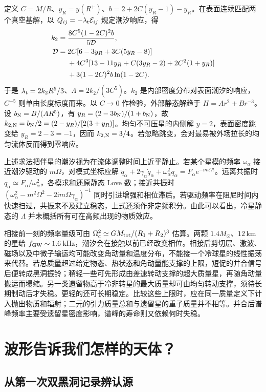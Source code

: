 定义 $C=M/R$、$y_R=y(R^+)$、$b=2+2C(y_R-1)-y_R$。在表面连续匹配两个真空基解，以 $Q_{ij}=-\lambda_{\rm t}{\cal E}_{ij}$ 规定潮汐响应，得
\begin{align*}
 k_2={}&\frac{8 C^5(1-2C)^2 b}{5{\cal D}},\\
 {\cal D}={}&2C[6-3y_R+3C(5y_R-8)]\\
 &+4C^3[13-11y_R+C(3y_R-2)+2C^2(1+y_R)]\\
 &+3(1-2C)^2 b\ln(1-2C).
\end{align*}
于是 $\lambda_{\rm t}=2 k_2 R^5/3$、$\Lambda=2 k_2/(3C^5)$。$k_2$ 是内部密度分布对表面潮汐的响应，$C^{-5}$ 则单由长度标度而来。以 $C\to0$ 作检验，外部静态解趋于 $H=A r^2+B r^{-3}$。设 $b_{\rm N}=B/(A R^5)$，有 $y_R=(2-3b_{\rm N})/(1+b_{\rm N})$，故 $k_{2,\rm N}=b_{\rm N}/2=(2-y_R)/[2(3+y_R)]$。均匀不可压星的内侧解 $y=2$，表面密度跳变给 $y_R=2-3=-1$，因而 $k_{2,\rm N}=3/4$。若忽略跳变，会对最易被外场拉长的均匀流体反而得到零响应。

上述求法把伴星的潮汐视为在流体调整时间上近乎静止。若某个星模的频率 $\omega_\alpha$ 接近潮汐驱动的 $m\Omega$，对模式坐标应解 $\ddot q_\alpha+2\gamma_\alpha\dot q_\alpha+\omega_\alpha^2q_\alpha=F_\alpha e^{-\mathrm i m\Omega t}$。远离共振时 $q_\alpha\simeq F_\alpha/\omega_\alpha^2$，各模求和还原静态 Love 数；接近共振时 $(\omega_\alpha^2-m^2\Omega^2-2\mathrm i m\Omega\gamma_\alpha)^{-1}$ 同时引进增强和相位滞后。若驱动频率在阻尼时间内快速扫过，共振来不及建立稳态，上式还须作非定频积分。由此可以看出，冷星静态的 $\Lambda$ 并未概括所有可在高频出现的物质效应。

相接前一刻的频率量级可由 $\Omega_c^2\simeq G M_{\rm tot}/(R_1+R_2)^3$ 估算。两颗 $1.4 M_\odot$、$12$\,km 的星给 $f_{\rm GW}\sim1.6$\,kHz，潮汐会在接触以前已经改变相位。相接后剪切层、激波、磁场以及中微子输运均可能改变角动量和温度分布，不能接一个冷球星的线性振荡来代替。若总质量超过给定物态、热状态和角动量能支撑的上限，短促的并合信号后便转成黑洞振铃；稍轻一些可先形成由差速转动支撑的超大质量星，再随角动量搬运而塌缩。另一类遗留物高于冷非转星的最大质量却可由均匀转动支撑，须待长期制动后才失稳。更轻的还可长期稳定。比较这些上限时，应在同一质量定义下计入抛出物质和辐射；二元的引力质量总和与遗留星的重子质量并不相等。并合后谱峰频率主要受遗留星密度影响，谱峰的寿命则又依赖何时失稳。

\section{波形告诉我们怎样的天体？}\label{sec:gw-cobs}

\subsection{从第一次双黑洞记录辨认源}


